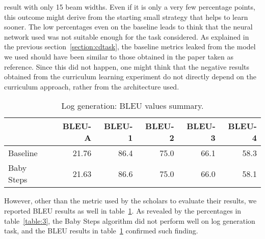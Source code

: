 result with only 15 beam widths. Even if it is only a very few percentage points, this outcome might derive from the starting small strategy
that helps to learn sooner.
The low percentages even on the baseline
leads to think that the neural network used was not suitable enough for the task considered.
As explained in the previous section~\ref{section:cdtask}, the baseline metrics leaked from the model we used
should have been similar to those obtained in the paper taken as reference. Since this did not happen,
one might think that the negative results obtained from the curriculum learning experiment do not directly 
depend on the curriculum approach, rather from the architecture used.
\begin{table}[h!]
    \centering
    \begin{tabular}{l|r|r|r|r|r}
     & BLEU-A & BLEU-1 & BLEU-2 & BLEU-3 & BLEU-4\\ [0.5ex] 
     \hline
     Baseline & 21.76 & 86.4 & 75.0 & 66.1 & 58.3\\  
     Baby Steps & 21.63 & 86.6 & 75.0 & 66.0 & 58.1\\ [1ex]
     \end{tabular}
    \caption{Log generation: BLEU values summary.}
    \label{table:4}
\end{table}
However, other than the metric used by the scholars to evaluate their results, we reported BLEU results as well in table~\ref{table:4}.
As revealed by the percentages in table~\ref{table:3}, the Baby Steps algorithm did not perform well
on log generation task, and the BLEU results in table~\ref{table:4} confirmed such finding.